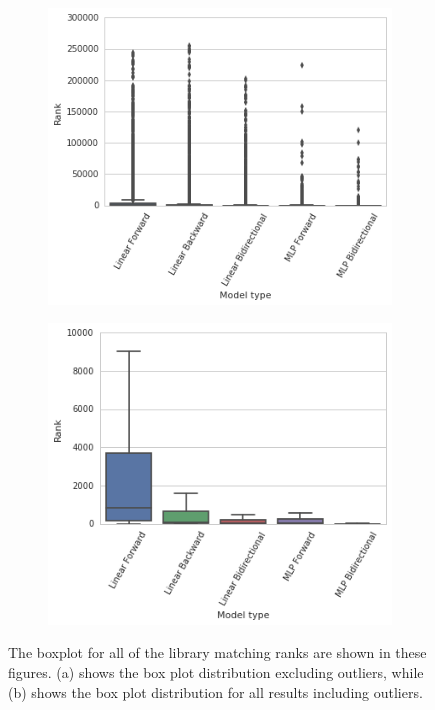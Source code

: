 \begin{figure}
  \centering
    \begin{subfigure}[b]{0.48\linewidth}
        \includegraphics[width=\linewidth]{./model_all_results_boxplot_outliers.png}
        \caption{}
    \end{subfigure}
    \begin{subfigure}[b]{0.48\linewidth}
        \includegraphics[width=\linewidth]{./model_all_results_boxplot.png}
        \caption{}
    \end{subfigure}
  \caption[Box Plot of Library Match Ranking Results]{
  The boxplot for all of the library matching ranks are shown in these figures.
  (a) shows the box plot distribution excluding outliers, while (b) shows the box plot distribution for all results including outliers.
  }
\end{figure}

